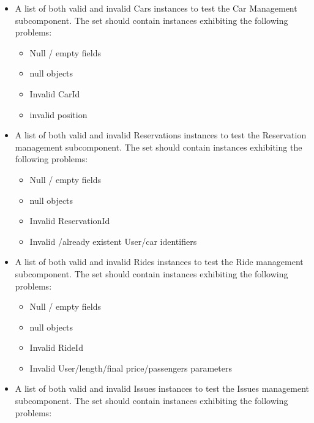 \documentclass{article}
\begin{document}
\begin{flushleft}
\begin{itemize}
  \item A list of both valid and invalid Cars  instances to test the Car Management subcomponent. The set should contain instances exhibiting the following problems:
  
  
    \begin{itemize}
  
    \item Null / empty fields
    \item null objects
    \item Invalid CarId
  \item invalid position
  \end{itemize}
  
  
  \item A list of both valid and invalid Reservations  instances to test the Reservation management subcomponent. The set should contain instances exhibiting the following problems:
  
  
  
    \begin{itemize}
  
    \item Null / empty fields
    \item null objects
    \item Invalid ReservationId
  \item Invalid /already existent User/car identifiers
  \end{itemize}
  
  
  
  \item A list of both valid and invalid Rides  instances to test the Ride management subcomponent. The set should contain instances exhibiting the following problems:
  
  
  
    \begin{itemize}
  
    \item Null / empty fields
    \item null objects
    \item Invalid RideId
  \item Invalid User/length/final price/passengers parameters
  \end{itemize}
  
 
  
  
    \item A list of both valid and invalid Issues  instances to test the  Issues management subcomponent. The set should contain instances exhibiting the following problems:
    \begin{itemize}
  

\end{itemize}
\end{itemize}
\end{flushleft}
\end{document}
